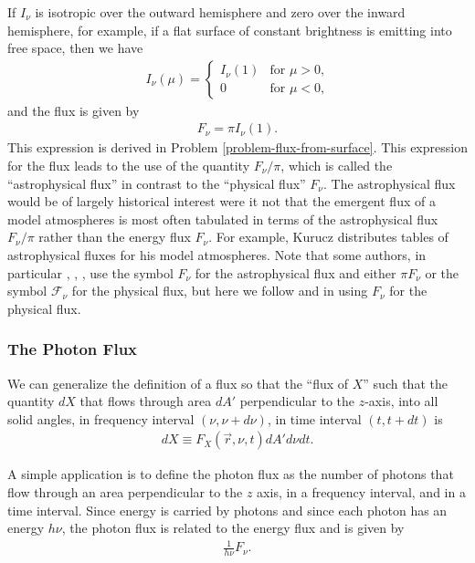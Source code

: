 If $I_\nu$ is isotropic over the outward hemisphere and zero
over the inward hemisphere, for example, if a flat surface
of constant brightness is emitting into free space, then we
have
\begin{align}
I_\nu(\mu) =
\begin{cases}
I_\nu(1)&\mbox{for $\mu>0$,}\\
0&\mbox{for $\mu<0$,}
\end{cases}
\end{align}
and the flux is given by 
\begin{align}
\label{eq-flux-from-surface}
F_\nu = \pi I_\nu(1).
\end{align}
This expression is derived in Problem \ref{problem-flux-from-surface}.
This expression for the flux leads to the use of the quantity
$F_\nu/\pi$, which is called the ``astrophysical flux'' in contrast to
the ``physical flux'' $F_\nu$. The astrophysical flux would be of
largely historical interest were it not that the emergent flux of a
model atmospheres is most often tabulated in terms of the astrophysical
flux $F_\nu/\pi$ rather than the energy flux $F_\nu$. For example,
Kurucz distributes tables of astrophysical fluxes for his model
atmospheres. Note that some authors, in particular
\cite{Chandrasekhar-1960}, \cite{Mihalas-1978}, \cite{Gray-1992}, use
the symbol $F_\nu$ for the astrophysical flux and either $\pi F_\nu$ or
the symbol $\mathcal{F}_\nu$ for the physical flux, but here we follow
\cite{Milne-1930} and \cite{Rybicki-1979} in using $F_\nu$ for the
physical flux.

\newslide

\subsubsection{The Photon Flux}

We can generalize the definition of a flux so that the ``flux of $X$'' such that the quantity $dX$ that flows through area
$dA'$ perpendicular to the $z$-axis, into all solid angles, in frequency interval $(\nu,\nu+d\nu)$, in
time interval $(t,t+dt)$ is
\begin{align}
dX \equiv F_X(\vec r, \nu, t) dA' d\nu dt.
\end{align}

A simple application is to define the photon flux as the number of photons that flow through an area perpendicular to the $z$ axis, in a frequency interval, and in
a time interval.
Since energy is carried by photons and since each photon has an energy
$h\nu$, the photon flux is related to the energy flux and
is given by
\begin{align}
\frac{1}{h\nu} F_\nu. 
\end{align}

